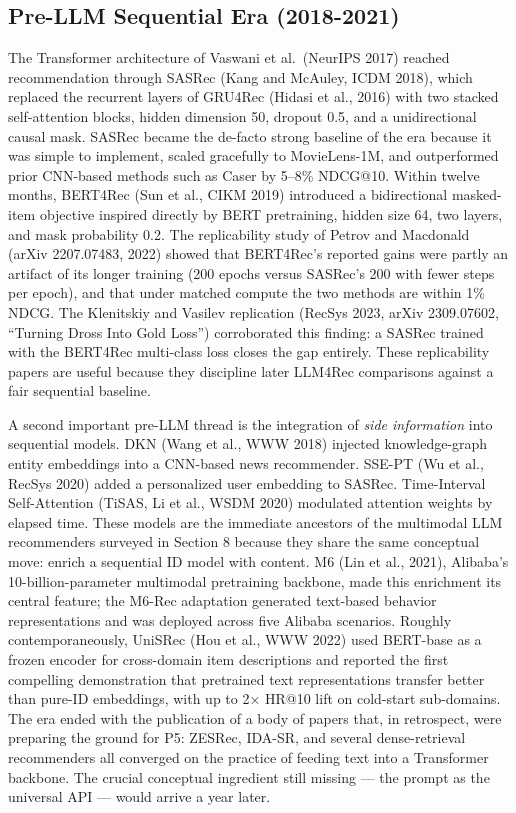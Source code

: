 \subsection{Pre-LLM Sequential Era (2018-2021)}\label{pre-llm-sequential-era-2018-2021}

The Transformer architecture of Vaswani et al.~(NeurIPS 2017) reached recommendation through SASRec (Kang and McAuley, ICDM 2018), which replaced the recurrent layers of GRU4Rec (Hidasi et al., 2016) with two stacked self-attention blocks, hidden dimension 50, dropout 0.5, and a unidirectional causal mask. SASRec became the de-facto strong baseline of the era because it was simple to implement, scaled gracefully to MovieLens-1M, and outperformed prior CNN-based methods such as Caser by 5--8\% NDCG@10. Within twelve months, BERT4Rec (Sun et al., CIKM 2019) introduced a bidirectional masked-item objective inspired directly by BERT pretraining, hidden size 64, two layers, and mask probability 0.2. The replicability study of Petrov and Macdonald (arXiv 2207.07483, 2022) showed that BERT4Rec's reported gains were partly an artifact of its longer training (200 epochs versus SASRec's 200 with fewer steps per epoch), and that under matched compute the two methods are within 1\% NDCG. The Klenitskiy and Vasilev replication (RecSys 2023, arXiv 2309.07602, ``Turning Dross Into Gold Loss'') corroborated this finding: a SASRec trained with the BERT4Rec multi-class loss closes the gap entirely. These replicability papers are useful because they discipline later LLM4Rec comparisons against a fair sequential baseline.

A second important pre-LLM thread is the integration of \emph{side information} into sequential models. DKN (Wang et al., WWW 2018) injected knowledge-graph entity embeddings into a CNN-based news recommender. SSE-PT (Wu et al., RecSys 2020) added a personalized user embedding to SASRec. Time-Interval Self-Attention (TiSAS, Li et al., WSDM 2020) modulated attention weights by elapsed time. These models are the immediate ancestors of the multimodal LLM recommenders surveyed in Section 8 because they share the same conceptual move: enrich a sequential ID model with content. M6 (Lin et al., 2021), Alibaba's 10-billion-parameter multimodal pretraining backbone, made this enrichment its central feature; the M6-Rec adaptation generated text-based behavior representations and was deployed across five Alibaba scenarios. Roughly contemporaneously, UniSRec (Hou et al., WWW 2022) used BERT-base as a frozen encoder for cross-domain item descriptions and reported the first compelling demonstration that pretrained text representations transfer better than pure-ID embeddings, with up to 2× HR@10 lift on cold-start sub-domains. The era ended with the publication of a body of papers that, in retrospect, were preparing the ground for P5: ZESRec, IDA-SR, and several dense-retrieval recommenders all converged on the practice of feeding text into a Transformer backbone. The crucial conceptual ingredient still missing --- the prompt as the universal API --- would arrive a year later.

